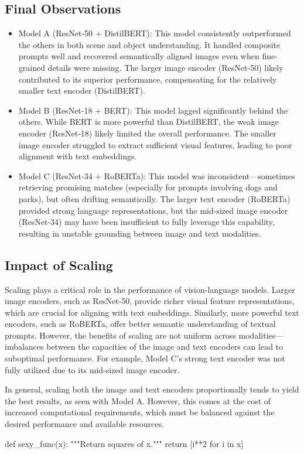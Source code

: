\documentclass[11pt]{article}
\begin{document}
\subsection{Final Observations}
\begin{itemize}
    \item{Model A (ResNet-50 + DistilBERT):} This model consistently outperformed the others in both scene and object understanding. It handled composite prompts well and recovered semantically aligned images even when fine-grained details were missing. The larger image encoder (ResNet-50) likely contributed to its superior performance, compensating for the relatively smaller text encoder (DistilBERT).
    \item{Model B (ResNet-18 + BERT):} This model lagged significantly behind the others. While BERT is more powerful than DistilBERT, the weak image encoder (ResNet-18) likely limited the overall performance. The smaller image encoder struggled to extract sufficient visual features, leading to poor alignment with text embeddings.
    \item{Model C (ResNet-34 + RoBERTa):} This model was inconsistent—sometimes retrieving promising matches (especially for prompts involving dogs and parks), but often drifting semantically. The larger text encoder (RoBERTa) provided strong language representations, but the mid-sized image encoder (ResNet-34) may have been insufficient to fully leverage this capability, resulting in unstable grounding between image and text modalities.
\end{itemize}

\subsection{Impact of Scaling}

Scaling plays a critical role in the performance of vision-language models. Larger image encoders, such as ResNet-50, provide richer visual feature representations, which are crucial for aligning with text embeddings. Similarly, more powerful text encoders, such as RoBERTa, offer better semantic understanding of textual prompts. However, the benefits of scaling are not uniform across modalities—imbalances between the capacities of the image and text encoders can lead to suboptimal performance. For example, Model C's strong text encoder was not fully utilized due to its mid-sized image encoder.

In general, scaling both the image and text encoders proportionally tends to yield the best results, as seen with Model A. However, this comes at the cost of increased computational requirements, which must be balanced against the desired performance and available resources.

\pagebreak

\begin{pythoncode}
    def sexy_func(x):
        """Return squares of x."""
        return [i**2 for i in x]
\end{pythoncode}
\end{document}
